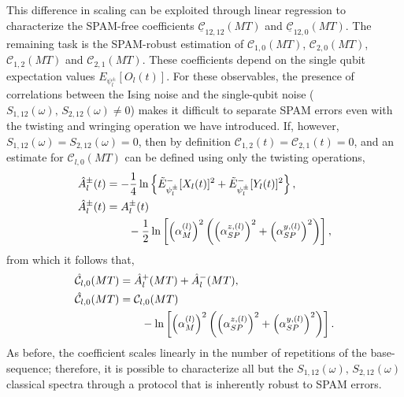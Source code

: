 \documentclass[%
 reprint,
superscriptaddress,
 amsmath,amssymb,
 aps,
pra,
]{revtex4-2}
\newcommand{\qk}[1]{{\color{OliveGreen}#1}}
\begin{document}
This difference in scaling can be exploited through linear regression to characterize the SPAM-free coefficients $\underline{\mathcal{C}}_{12,12}(MT)$ and $\underline{\mathcal{C}}_{12,0}(MT)$. The remaining task is the SPAM-robust estimation of $\mathcal{C}_{1,0}(MT)$, $\mathcal{C}_{2,0}(MT)$, $\mathcal{C}_{1,2}(MT)$ and $\mathcal{C}_{2,1}(MT)$. These coefficients depend on the single qubit expectation values $E_{\psi_l^\pm}[O_l(t)]$. For these observables, the presence of correlations between the Ising noise and the single-qubit noise ($S_{1,12}(\omega),\,S_{2,12}(\omega)\neq 0$) makes it difficult to separate SPAM errors even with the twisting and wringing operation we have introduced. If, however, $S_{1,12}(\omega)=S_{2,12}(\omega)= 0$, then by definition $\mathcal{C}_{1,2}(t)=\mathcal{C}_{2,1}(t)=0$, and an estimate for $\mathcal{C}_{l,0}(MT)$ can be defined using only the twisting operations,
\begin{align}
    \hat{A}_l^\pm(t)&=-\frac{1}{4}\ln\left\{\tilde{E}^-_{\psi_l^\pm}[X_l(t)]^2+\tilde{E}^-_{\psi_l^\pm}[Y_l(t)]^2\right\},\\
    \hat{A}_l^\pm(t)&=A^\pm_l(t)\notag\\
    &\qquad-\frac{1}{2}\ln\left[\left(\alpha_M^{(l)}\right)^2 \left(\left(\alpha_{SP}^{z,(l)}\right)^2+\left(\alpha_{SP}^{y,(l)}\right)^2\right)\right],
\end{align}
from which it follows that,
\begin{align}
    \hat{\mathcal{C}}_{l,0}(MT)&=\hat{A}^+_l(MT)+\hat{A}^-_l(MT),\\
    \hat{\mathcal{C}}_{l,0}(MT)&=\mathcal{C}_{l,0}(MT)\notag\\
    &\qquad-\ln\left[\left(\alpha_M^{(l)}\right)^2 \left(\left(\alpha_{SP}^{z,(l)}\right)^2+\left(\alpha_{SP}^{y,(l)}\right)^2\right)\right].
\end{align}
As before, the coefficient scales linearly in the number of repetitions of the base-sequence; therefore, it is possible to characterize all but the $S_{1,12}(\omega),\,S_{2,12}(\omega)$ classical spectra through a protocol that is inherently robust to SPAM errors.

\end{document}
